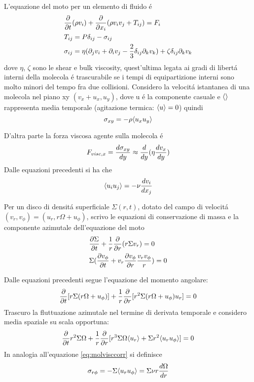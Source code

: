 L'equazione del moto per un elemento di fluido \'e
\begin{align}
&\PDof{t}(\rho v_i)+\PDof{x_i}(\rho v_iv_j+T_{ij})=F_i\label{eq:fluidmotion}\\
&T_{ij}=P\delta_{ij}-\sigma_{ij}\\
&\sigma_{ij}=\eta(\partial_jv_i+\partial_iv_j-\frac{2}{3}\delta_{ij}\partial_kv_k)+\zeta\delta_{ij}\partial_kv_k
\end{align}
dove $\eta$, $\zeta$ sono le shear e bulk viscosity, quest'ultima legata ai gradi di libert\'a interni della molecola \'e trascurabile se i tempi di equipartizione interni sono molto minori del tempo fra due collisioni.
Considero la velocit\'a istantanea di una molecola nel piano xy $(v_x+u_x,u_y)$, dove u \'e la componente casuale e $\exv{}$ rappresenta media temporale (agitazione termica: $\exv{u}=0$) quindi
\begin{equation}
\sigma_{xy}=-\rho\exv{u_xu_y}
\end{equation}

D'altra parte la forza viscosa agente sulla molecola \'e
\begin{equation}
F_{visc,x}=\TDy{y}{\sigma_{xy}}\approx\TDof{y}(\eta\TDy{y}{v_x})
\end{equation}
Dalle equazioni precedenti si ha che
\begin{equation}
\exv{u_iu_j}=-\nu\TDy{x_j}{v_i}\label{eq:molvisccorr}
\end{equation}

Per un disco di densit\'a superficiale $\Sigma(r,t)$, dotato del campo di velocit\'a $(v_r,v_{\phi})=(u_r,r\Omega+u_{\phi})$, scrivo le equazioni di conservazione di massa e la componente azimutale dell'equazione del moto
\begin{align}
&\PDy{t}{\Sigma}+\frac{1}{r}\PDof{r}(r\Sigma v_r)=0\\
&\Sigma(\PDy{t}{v_{\phi}}+v_r\PDy{r}{v_{\phi}}\frac{v_rv_{\phi}}{r})=0
\end{align}

Dalle equazioni precedenti segue l'equazione del momento angolare:
\begin{equation}
\PDof{t}[r\Sigma(r\Omega+u_{\phi})]+\frac{1}{r}\PDof{r}[r^2\Sigma(r\Omega+u_{\phi})u_r]=0
\end{equation}
Trascuro la fluttuazione azimutale nel termine di derivata temporale e considero media spaziale su scala opportuna:
\begin{equation}
\PDof{t}r^2\Sigma\Omega+\frac{1}{r}\PDof{r}[r^3\Sigma\Omega\exv{u_r}+\Sigma r^2\exv{u_ru_{\phi}}]=0
\end{equation}
In analogia all'equazione \eqref{eq:molvisccorr} si definisce
\begin{equation}
\sigma_{r\phi}=-\Sigma\exv{u_ru_{\phi}}=\Sigma\nu r \TDy{r}{\Omega}
\end{equation}

